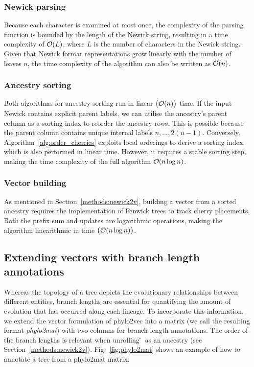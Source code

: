 \subsubsection{Newick parsing}

Because each character is examined at most once, the complexity of the parsing function is bounded by the length of the Newick string, resulting in a time complexity of $\mathcal{O}(L)$, where $L$ is the number of characters in the Newick string. Given that Newick format representations grow linearly with the number of leaves $n$, the time complexity of the algorithm can also be written as $\mathcal{O}(n)$.

\subsubsection{Ancestry sorting}

Both algorithms for ancestry sorting run in linear $\big(\mathcal{O}(n)\big)$ time. If the input Newick contains explicit parent labels, we can utilise the ancestry's parent column as a sorting index to reorder the ancestry rows. This is possible because the parent column contains unique internal labels $n, ..., 2(n-1)$. Conversely, Algorithm~\ref{alg:order_cherries} exploits local orderings to derive a sorting index, which is also performed in linear time. However, it requires a stable sorting step, making the time complexity of the full algorithm $\mathcal{O}(n\log n)$.

\subsubsection{Vector building}

As mentioned in Section~\ref{methods:newick2v}, building a vector from a sorted ancestry requires the implementation of Fenwick trees to track cherry placements. Both the prefix sum and updates are logarithmic operations, making the algorithm linearithmic in time $\big(\mathcal{O}(n\log n)\big)$.

\subsection{Extending vectors with branch length annotations}

Whereas the topology of a tree depicts the evolutionary relationships between different entities, branch lengths are essential for quantifying the amount of evolution that has occurred along each lineage. To incorporate this information, we extend the vector formulation of phylo2vec into a matrix (we call the resulting format \emph{phylo2mat}) with two columns for branch length annotations. The order of the branch lengths is relevant when unrolling \v~as an ancestry (see Section~\ref{methods:newick2v}). Fig.~\ref{fig:phylo2mat} shows an example of how to annotate a tree from a phylo2mat matrix. 

